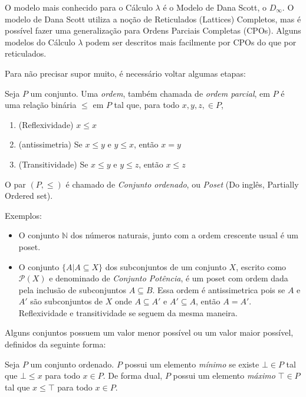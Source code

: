 \documentclass[../main.tex]{subfiles}
\begin{document}
O modelo mais conhecido para o Cálculo $\lambda$ é o Modelo de Dana Scott, o $D_{\infty}$. O modelo de Dana Scott utiliza a noção de Reticulados (Lattices) Completos, mas é possível fazer uma generalização para Ordens Parciais Completas (CPOs). Alguns modelos do Cálculo $\lambda$ podem ser descritos mais facilmente por CPOs do que por reticulados. 

Para não precisar supor muito, é necessário voltar algumas etapas:


\begin{definition}
    Seja $P$ um conjunto. Uma \emph{ordem}, também chamada de \emph{ordem parcial}, em $P$ é uma relação binária $\leq$ em $P$ tal que, para todo $x, y, z, \in P$,
    \begin{enumerate}
        \item (Reflexividade) $x \leq x$
        \item (antissimetria) Se $x \leq y$ e $y \leq x$, então $x = y$
        \item (Transitividade) Se $x \leq y$ e $y \leq z$, então $x \leq z$
    \end{enumerate}
\end{definition}

O par $(P, \leq)$ é chamado de \emph{Conjunto ordenado}, ou \emph{Poset} (Do inglês, Partially Ordered set).

Exemplos:
\begin{itemize}
    \item O conjunto $\mathbb{N}$ dos números naturais, junto com a ordem crescente usual é um poset.
    \item O conjunto $\{ A | A \subseteq X\}$ dos subconjuntos de um conjunto $X$, escrito como $\mathcal{P}(X)$ e denominado de \emph{Conjunto Potência}, é um poset com ordem dada pela inclusão de subconjuntos $A \subseteq B$. Essa ordem é antissimetrica pois se $A$ e $A'$ são subconjuntos de $X$ onde $A \subseteq A'$ e $A' \subseteq A$, então $A = A'$. Reflexividade e transitividade se seguem da mesma maneira.
\end{itemize}

Alguns conjuntos possuem um valor menor possível ou um valor maior possível, definidos da seguinte forma:

\begin{definition}
    Seja $P$ um conjunto ordenado. $P$ possui um elemento \emph{mínimo} se existe $\bot \in P$ tal que $\bot \leq x$ para todo $x \in P$. De forma dual, $P$ possui um elemento \emph{máximo} $\top \in P$ tal que $x \leq \top$ para todo $x \in P$.
\end{definition}
\end{document}
